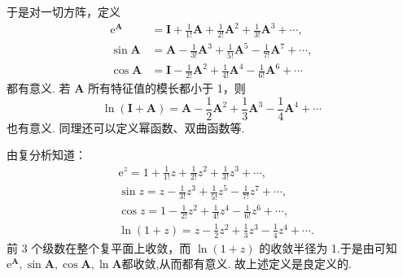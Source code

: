 \documentclass[../../main.tex]{subfiles}%
\begin{document}
\begin{definition}\label{definition:矩阵函数}
于是对一切方阵，定义
\begin{align*}
\mathrm{e}^{\boldsymbol{A}}&= \boldsymbol{I}+\frac{1}{1!}\boldsymbol{A}+\frac{1}{2!}\boldsymbol{A}^{2}+\frac{1}{3!}\boldsymbol{A}^{3}+\cdots,\\
\sin\boldsymbol{A}&= \boldsymbol{A}-\frac{1}{3!}\boldsymbol{A}^{3}+\frac{1}{5!}\boldsymbol{A}^{5}-\frac{1}{7!}\boldsymbol{A}^{7}+\cdots,\\
\cos\boldsymbol{A}&= \boldsymbol{I}-\frac{1}{2!}\boldsymbol{A}^{2}+\frac{1}{4!}\boldsymbol{A}^{4}-\frac{1}{6!}\boldsymbol{A}^{6}+\cdots
\end{align*}
都有意义. 若 $\boldsymbol{A}$ 所有特征值的模长都小于 1，则 
\[
\ln(\boldsymbol{I}+\boldsymbol{A})=\boldsymbol{A}-\frac{1}{2}\boldsymbol{A}^{2}+\frac{1}{3}\boldsymbol{A}^{3}-\frac{1}{4}\boldsymbol{A}^{4}+\cdots
\]
也有意义. 同理还可以定义幂函数、双曲函数等. 
\end{definition}
\begin{remark}
由复分析知道：
\begin{align*}
&\mathrm{e}^{z}= 1+\frac{1}{1!}z+\frac{1}{2!}z^{2}+\frac{1}{3!}z^{3}+\cdots,\\
&\sin z= z-\frac{1}{3!}z^{3}+\frac{1}{5!}z^{5}-\frac{1}{7!}z^{7}+\cdots,\\
&\cos z= 1-\frac{1}{2!}z^{2}+\frac{1}{4!}z^{4}-\frac{1}{6!}z^{6}+\cdots,\\
&\ln(1 + z)=z-\frac{1}{2}z^{2}+\frac{1}{3}z^{3}-\frac{1}{4}z^{4}+\cdots.
\end{align*}
前 3 个级数在整个复平面上收敛，而 $\ln(1 + z)$ 的收敛半径为 1.于是由可知$\mathrm{e}^{\boldsymbol{A}},\sin \boldsymbol{A},\cos \boldsymbol{A},\ln{\boldsymbol{A}}$都收敛,从而都有意义.
故上述定义是良定义的.
\end{remark}
\end{document}
